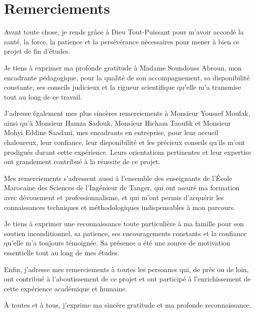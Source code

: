 \chapter*{Remerciements}

Avant toute chose, je rends grâce à Dieu Tout-Puissant pour m'avoir accordé la santé, la force, la patience et la persévérance nécessaires pour mener à bien ce projet de fin d'études.

Je tiens à exprimer ma profonde gratitude à Madame Soundouss Abroun, mon encadrante pédagogique, pour la qualité de son accompagnement, sa disponibilité constante, ses conseils judicieux et la rigueur scientifique qu'elle m'a transmise tout au long de ce travail.

J'adresse également mes plus sincères remerciements à Monsieur Youssef Moufak, ainsi qu'à Monsieur Hamza Sadouk, Monsieur Hicham Taoufik et Monsieur Mohyi Eddine Saadani, mes encadrants en entreprise, pour leur accueil chaleureux, leur confiance, leur disponibilité et les précieux conseils qu'ils m'ont prodigués durant cette expérience. Leurs orientations pertinentes et leur expertise ont grandement contribué à la réussite de ce projet.

Mes remerciements s'adressent aussi à l'ensemble des enseignants de l'École Marocaine des Sciences de l'Ingénieur de Tanger, qui ont assuré ma formation avec dévouement et professionnalisme, et qui m'ont permis d'acquérir les connaissances techniques et méthodologiques indispensables à mon parcours.

Je tiens à exprimer une reconnaissance toute particulière à ma famille pour son soutien inconditionnel, sa patience, ses encouragements constants et la confiance qu'elle m'a toujours témoignée. Sa présence a été une source de motivation essentielle tout au long de mes études.

Enfin, j'adresse mes remerciements à toutes les personnes qui, de près ou de loin, ont contribué à l'aboutissement de ce projet et ont participé à l'enrichissement de cette expérience académique et humaine.

À toutes et à tous, j'exprime ma sincère gratitude et ma profonde reconnaissance.
\clearpage